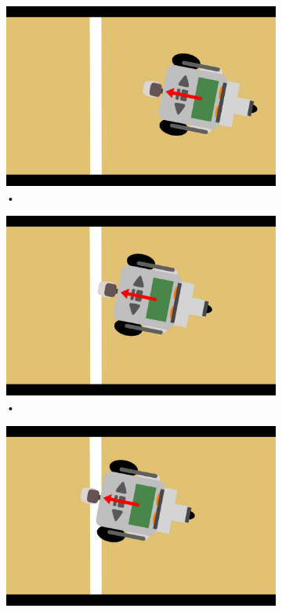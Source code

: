 \documentclass[tt3]{penoverslag}
\begin{document}
\begin{figure}
\centering
	\begin{subfigure}[h]{0.24\textwidth}
		\includegraphics[width=\textwidth]{WitteLijn1}
		\caption{•}
		\label{fig:AlgoWit1}
	\end{subfigure}
	\begin{subfigure}[h]{0.24\textwidth}
		\includegraphics[width=\textwidth]{WitteLijn2}
		\caption{•}
		\label{fig:AlgoWit2}
	\end{subfigure}
	\begin{subfigure}[h]{0.24\textwidth}
		\includegraphics[width=\textwidth]{WitteLijn3}

\end{subfigure}
\end{figure}
\end{document}
